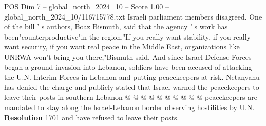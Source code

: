 \begin{textsample}{POS Dim 7 – global\_north\_2024\_10 – Score 1.00 – global\_north\_2024\_10/116715778.txt}
Israeli parliament members disagreed.
One of the bill ' s authors, Boaz Bismuth, said that the agency ' s work has been"counterproductive"in the region."If you really want stability, if you really want security, if you want real peace in the Middle East, organizations like UNRWA won't bring you there,"Bismuth said.
And since Israel Defense Forces began a ground invasion into Lebanon, soldiers have been accused of attacking the U.N.
Interim Forces in Lebanon and putting peacekeepers at risk.
Netanyahu has denied the charge and publicly stated that Israel warned the peacekeepers to leave their posts in southern Lebanon @ @ @ @ @ @ @ @ @ @ peacekeepers are mandated to stay along the Israel-Lebanon border observing hostilities by U.N. \textbf{Resolution} 1701 and have refused to leave their posts.

\end{textsample}
